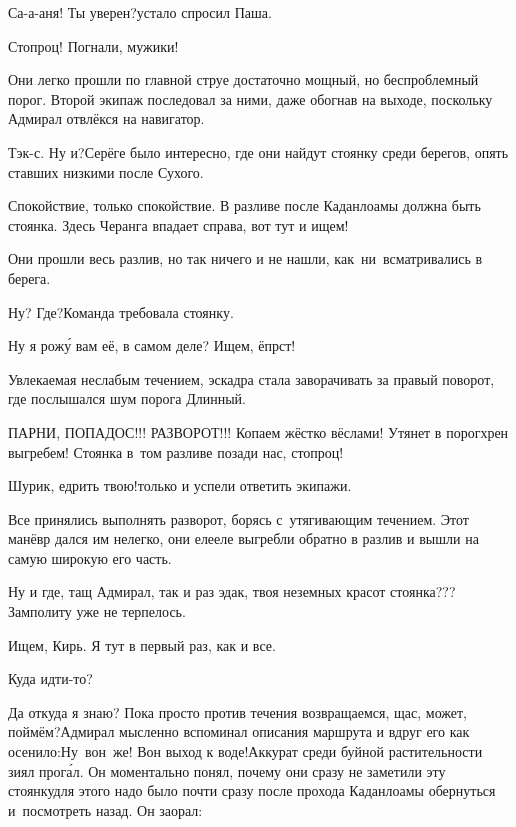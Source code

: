 
\diagdash Са-а-аня! Ты уверен?\mdash устало спросил Паша.

\diagdash Стопроц! Погнали, мужики!

Они легко прошли по главной струе достаточно мощный, но беспроблемный порог. Второй экипаж последовал за ними, даже обогнав на выходе, поскольку Адмирал отвлёкся на навигатор.

\diagdash Тэк-с. Ну и?\mdash Серёге было интересно, где они найдут стоянку среди берегов, опять ставших низкими после Сухого.

\diagdash Спокойствие, только спокойствие. В разливе после Каданлоамы должна быть стоянка. Здесь Черанга впадает справа, вот тут и ищем!

Они прошли весь разлив, но так ничего и не нашли, как~ни~всматривались в берега.

\diagdash Ну? Где?\mdash Команда требовала стоянку.

\diagdash Ну я рож\'{у} вам её, в самом деле? Ищем, ёпрст! 

Увлекаемая неслабым течением, эскадра стала заворачивать за правый поворот, где послышался шум порога Длинный.

\diagdash ПАРНИ, ПОПАДОС!!! РАЗВОРОТ!!! Копаем жёстко вёслами! Утянет в порог\mdash хрен выгребем! Стоянка в~том разливе позади нас, стопроц!

\diagdash Шурик, едрить твою!\mdash только и успели ответить экипажи. 

Все принялись выполнять разворот, борясь с~утягивающим течением. Этот манёвр дался им нелегко, они еле\sdash еле выгребли обратно в разлив и вышли на самую широкую его часть.

\diagdash Ну и где, тащ Адмирал, так и раз эдак, твоя неземных красот стоянка???\mdash Замполиту уже не терпелось.

\diagdash Ищем, Кирь. Я тут в первый раз, как и все.

\diagdash Куда идти-то?

\diagdash Да откуда я знаю? Пока просто против течения возвращаемся, щас, может, поймём?\mdash Адмирал мысленно вспоминал описания маршрута и вдруг его как осенило:\mdash Ну~вон~же! Вон выход к воде!\mdash Аккурат среди буйной растительности зиял прог\'{а}л. Он моментально понял, почему они сразу не заметили эту стоянку\mdash для этого надо было почти сразу после прохода Каданлоамы обернуться и~посмотреть назад. Он заорал:

